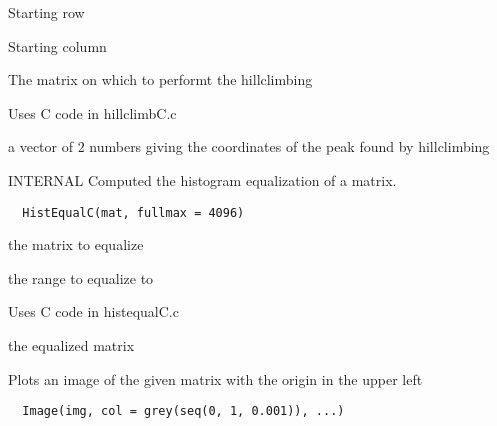 \documentclass[a4paper]{book}
\begin{document}
%
\begin{Arguments}
\begin{ldescription}
\item[\code{y}] Starting row

\item[\code{x}] Starting column

\item[\code{img}] The matrix on which to performt the
hillclimbing
\end{ldescription}
\end{Arguments}
%
\begin{Details}\relax
Uses C code in hillclimbC.c
\end{Details}
%
\begin{Value}
a vector of 2 numbers giving the coordinates of the peak
found by hillclimbing
\end{Value}
%
\begin{Description}\relax
INTERNAL Computed the histogram equalization of a matrix.
\end{Description}
%
\begin{Usage}
\begin{verbatim}
  HistEqualC(mat, fullmax = 4096)
\end{verbatim}
\end{Usage}
%
\begin{Arguments}
\begin{ldescription}
\item[\code{mat}] the matrix to equalize

\item[\code{fullmax}] the range to equalize to
\end{ldescription}
\end{Arguments}
%
\begin{Details}\relax
Uses C code in histequalC.c
\end{Details}
%
\begin{Value}
the equalized matrix
\end{Value}
%
\begin{Description}\relax
Plots an image of the given matrix with the origin in the
upper left
\end{Description}
%
\begin{Usage}
\begin{verbatim}
  Image(img, col = grey(seq(0, 1, 0.001)), ...)
\end{verbatim}
\end{Usage}
\end{document}
